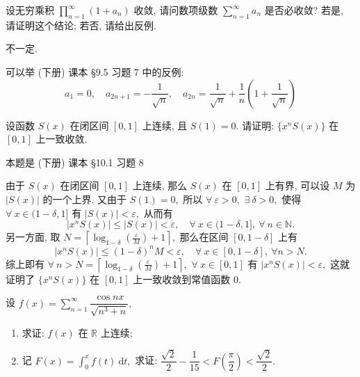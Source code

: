 \begin{question}[points = 10]
设无穷乘积 $\displaystyle \prod_{n=1}^\infty (1+a_n)$ 收敛, 请问数项级数 $\displaystyle \sum_{n=1}^\infty a_n$ 是否必收敛? 若是, 请证明这个结论; 若否, 请给出反例.

\end{question}

\begin{solution}
不一定.

可以举 (下册) 课本 \S 9.5 习题 7 中的反例:
\begin{equation*}
a_1 = 0, \quad a_{2n+1} = -\dfrac{1}{\sqrt{n}}, \quad a_{2n} = \dfrac{1}{\sqrt{n}} + \dfrac{1}{n} \left( 1 + \dfrac{1}{\sqrt{n}} \right)
\end{equation*}
\end{solution}


\begin{question}[points = 10]
设函数 $S(x)$ 在闭区间 $[0,1]$ 上连续, 且 $S(1) = 0.$ 请证明: $\{x^n S(x)\}$ 在 $[0,1]$ 上一致收敛.

\end{question}

\begin{solution}
本题是 (下册) 课本 \S 10.1 习题 8

由于 $S(x)$ 在闭区间 $[0,1]$ 上连续, 那么 $S(x)$ 在 $[0,1]$ 上有界, 可以设 $M$ 为 $|S(x)|$ 的一个上界. 又由于 $S(1) = 0,$ 所以 $\forall ~ \varepsilon > 0,$ $\exists ~ \delta > 0,$ 使得 $\forall ~ x \in (1-\delta, 1]$ 有 $|S(x)| < \varepsilon,$ 从而有
\begin{equation*}
|x^nS(x)| \leqslant |S(x)| < \varepsilon, \quad \forall ~ x \in (1-\delta, 1], ~ \forall ~ n \in \mathbb{N}.
\end{equation*}
另一方面, 取 $N = \left\lceil \log_{1-\delta} \left( \frac{\varepsilon}{M} \right) + 1 \right\rceil,$ 那么在区间 $[0, 1 - \delta]$ 上有
\begin{equation*}
|x^nS(x)| \leqslant (1 - \delta)^n M < \varepsilon, \quad \forall~x \in [0, 1 - \delta], ~ \forall n > N.
\end{equation*}
综上即有 $\forall ~ n > N = \left\lceil \log_{1-\delta} \left( \frac{\varepsilon}{M} \right) + 1 \right\rceil,$ $\forall ~ x \in [0, 1]$ 有 $|x^nS(x)| < \varepsilon,$ 这就证明了 $\{x^n S(x)\}$ 在 $[0,1]$ 上一致收敛到常值函数 $0.$
\end{solution}


\begin{question}[points = 10]
设 $\displaystyle f(x) = \sum\limits_{n=1}^{\infty} \dfrac{\cos nx}{\sqrt{n^3 + n}},$
\begin{enumerate}
\item 求证: $f(x)$ 在 $\mathbb{R}$ 上连续;
\item 记 $\displaystyle F(x) = \int_0^x f(t) ~ \mathrm{d} t,$ 求证: $\dfrac{\sqrt{2}}{2} - \dfrac{1}{15} < F \left( \dfrac{\pi}{2} \right) < \dfrac{\sqrt{2}}{2}.$
\end{enumerate}

\end{question}

